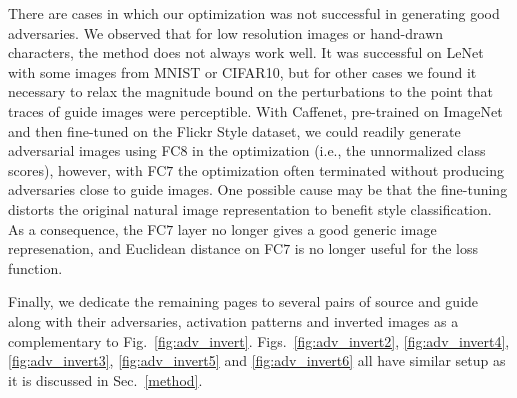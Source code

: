 \documentclass{article} %
\begin{document}
There are cases in which our optimization was not successful in generating good 
adversaries.  We observed that for low resolution images or hand-drawn 
characters, the method does not always work well.  It was successful on LeNet 
with some images from MNIST or CIFAR10, but for other cases we found it 
necessary to relax the magnitude bound on the perturbations to the point that 
traces of guide images were perceptible. With Caffenet, pre-trained on ImageNet 
and then fine-tuned on the Flickr Style dataset, we could readily generate 
adversarial images using FC$8$ in the optimization (i.e., the unnormalized 
class scores), however, with FC$7$ the optimization often terminated without 
producing adversaries close to guide images.  One possible cause may be that 
the fine-tuning distorts the original natural image representation to benefit 
style classification. As a consequence, the FC$7$ layer no longer gives a good 
generic image represenation, and Euclidean distance on FC$7$ is no longer 
useful for the loss function.

Finally, we dedicate the remaining pages to several pairs of source and guide
along with their adversaries, activation patterns and inverted images as a 
complementary to Fig.~\ref{fig:adv_invert}. Figs.~\ref{fig:adv_invert2}, 
\ref{fig:adv_invert4}, \ref{fig:adv_invert3}, \ref{fig:adv_invert5} and \ref{fig:adv_invert6}
all have similar setup as it is discussed in Sec.~\ref{method}.
\end{document}
